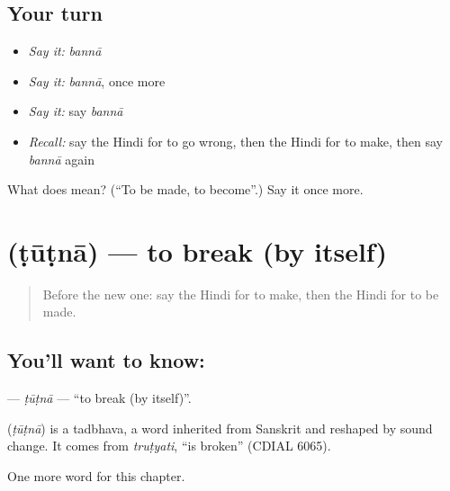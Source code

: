 \subsection*{Your turn}
\begin{itemize}
\raggedright
  \item \emph{Say it:} \emph{bannā}
  \item \emph{Say it:} \emph{bannā}, once more
  \item \emph{Say it:} say \emph{bannā}
  \item \emph{Recall:} say the Hindi for to go wrong, then the Hindi for to make, then say \emph{bannā} again
\end{itemize}

\begin{tcolorbox}[breakable,colback=teal!4,colframe=teal!35!black,title={Before you move on}]
What does  mean? (\textquotedblleft{}To be made, to become\textquotedblright{}.) Say it once more.
\end{tcolorbox}
\section[\texorpdfstring{\hi{टूटना} (ṭūṭnā)}{टूटना (ṭūṭnā)}]{ (ṭūṭnā) — to break (by itself)}

\label{lesson:HI-C226-tutna}



\begin{quote}
Before the new one: say the Hindi for to make, then the Hindi for to be made.
\end{quote}

\subsection*{You'll want to know: }
\textbf{} — \emph{ṭūṭnā} — \textquotedblleft{}to break (by itself)\textquotedblright{}.

\begin{cousinweb}
\textbf{} (\emph{ṭūṭnā}) is a tadbhava, a word inherited from Sanskrit and reshaped by sound change. It comes from \emph{truṭyati}, \textquotedblleft{}is broken\textquotedblright{} (CDIAL 6065).
\end{cousinweb}

\begin{grammarlens}[title={What you've built}]
One more word for this chapter.
\end{grammarlens}

